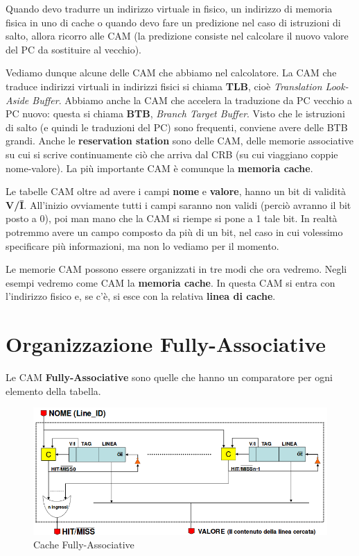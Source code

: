 \documentclass[11pt]{book}
\begin{document}
\par\bigskip

Quando devo tradurre un indirizzo virtuale in fisico, un indirizzo di
memoria fisica in uno di cache o quando devo fare un predizione nel
caso di istruzioni di salto, allora ricorro alle CAM (la predizione
consiste nel calcolare il nuovo valore del PC da sostituire al
vecchio). 

\par\bigskip

Vediamo dunque alcune delle CAM che abbiamo nel calcolatore. La CAM
che traduce indirizzi virtuali in indirizzi fisici si chiama {\bf
  TLB}, cio\`e {\em Translation Look-Aside Buffer}. Abbiamo anche la
CAM che accelera la traduzione da PC vecchio a PC nuovo: questa si
chiama {\bf BTB}, {\em Branch Target Buffer}. Visto che le istruzioni
di salto (e quindi le traduzioni del PC) sono frequenti, conviene
avere delle BTB grandi. Anche le {\bf reservation station} sono delle
CAM, delle memorie associative su cui si scrive continuamente ci\`o
che arriva dal CRB (su cui viaggiano coppie nome-valore). La pi\`u
importante CAM \`e comunque la {\bf memoria cache}.

\par\bigskip

Le tabelle CAM oltre ad avere i campi {\bf nome} e {\bf valore}, hanno
un bit di validit\`a {\bf V/\={I}}. All'inizio ovviamente tutti i
campi saranno non validi (perci\`o avranno il bit posto a 0), poi man
mano che la CAM si riempe si pone a 1 tale bit. In realt\`a potremmo
avere un campo composto da pi\`u di un bit, nel caso in cui volessimo
specificare pi\`u informazioni, ma non lo vediamo per il momento.

\par\bigskip

Le memorie CAM possono essere organizzati in tre modi che ora
vedremo. Negli esempi vedremo come CAM la {\bf memoria cache}. In
questa CAM si entra con l'indirizzo fisico e, se c'\`e, si esce con la
relativa {\bf linea di cache}.

\section{Organizzazione Fully-Associative}

Le CAM {\bf Fully-Associative} sono quelle che hanno un comparatore
per ogni elemento della tabella.

\begin{figure}[h]
  \centering
  \includegraphics[width=.8\textwidth]{images/fullyassociative.png}
  \caption{Cache Fully-Associative}
  \label{fullyassociative}
\end{figure}
\end{document}
